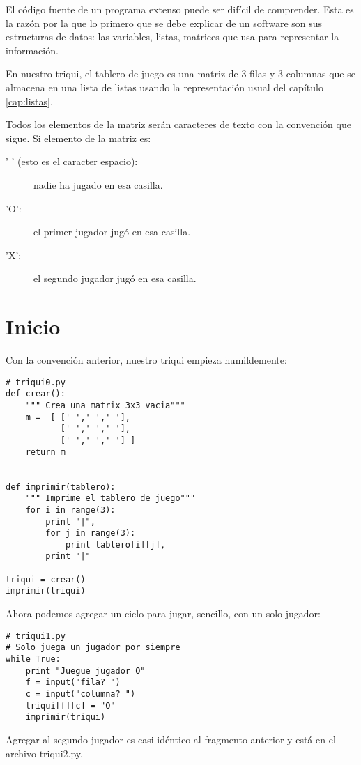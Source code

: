 El código fuente de un programa extenso puede ser difícil de comprender. Esta es
la razón por la que lo primero que se debe explicar de un software son sus 
estructuras de datos: las variables, listas, matrices que usa para representar
la información. 

En nuestro triqui, el tablero de juego es una matriz de 3 filas y 3 columnas que
se almacena en una lista de listas usando la representación usual del capítulo 
\ref{cap:listas}. 

Todos los elementos de la matriz serán caracteres de texto con la 
convención que sigue. Si elemento de la matriz es:

\begin{description}
  \item[' ' (esto es el caracter espacio):]   nadie ha jugado en esa casilla.
  \item['O': ] el primer jugador jugó en esa casilla.
  \item['X':] el segundo jugador jugó en esa casilla.
\end{description}

\section{Inicio}

Con la convención anterior, nuestro triqui empieza humildemente:

\beforeverb
\begin{verbatim}
# triqui0.py
def crear():
    """ Crea una matrix 3x3 vacia"""
    m =  [ [' ',' ',' '],
           [' ',' ',' '],
           [' ',' ',' '] ]
    return m


def imprimir(tablero):
    """ Imprime el tablero de juego"""
    for i in range(3):
        print "|",
        for j in range(3):
            print tablero[i][j],
        print "|"
        
triqui = crear()
imprimir(triqui)
\end{verbatim}
\afterverb

Ahora podemos agregar un ciclo para jugar, sencillo, con un solo jugador:

\beforeverb
\begin{verbatim}
# triqui1.py
# Solo juega un jugador por siempre 
while True:
    print "Juegue jugador O"
    f = input("fila? ")
    c = input("columna? ")
    triqui[f][c] = "O"
    imprimir(triqui)
\end{verbatim}
\afterverb

Agregar al segundo jugador es casi idéntico al fragmento anterior y  está en el 
archivo triqui2.py. 

